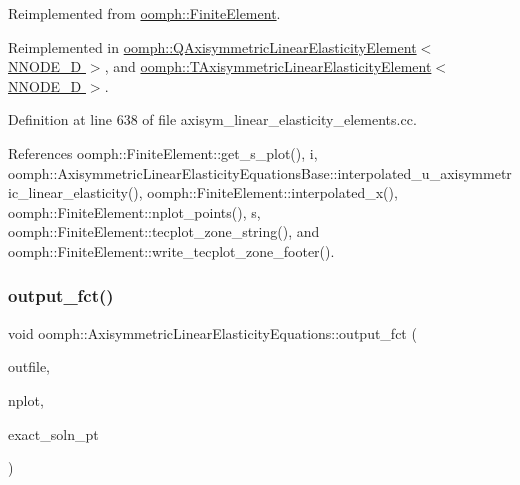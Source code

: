 Reimplemented from \hyperlink{classoomph_1_1FiniteElement_adfaee690bb0608f03320eeb9d110d48c}{oomph\+::\+Finite\+Element}.



Reimplemented in \hyperlink{classoomph_1_1QAxisymmetricLinearElasticityElement_a50c3225e93aad5867288cf55aac73195}{oomph\+::\+Q\+Axisymmetric\+Linear\+Elasticity\+Element$<$ N\+N\+O\+D\+E\+\_\+D $>$}, and \hyperlink{classoomph_1_1TAxisymmetricLinearElasticityElement_a834bb7feb673a5cf90b07ee16f6b1fa5}{oomph\+::\+T\+Axisymmetric\+Linear\+Elasticity\+Element$<$ N\+N\+O\+D\+E\+\_\+D $>$}.



Definition at line 638 of file axisym\+\_\+linear\+\_\+elasticity\+\_\+elements.\+cc.



References oomph\+::\+Finite\+Element\+::get\+\_\+s\+\_\+plot(), i, oomph\+::\+Axisymmetric\+Linear\+Elasticity\+Equations\+Base\+::interpolated\+\_\+u\+\_\+axisymmetric\+\_\+linear\+\_\+elasticity(), oomph\+::\+Finite\+Element\+::interpolated\+\_\+x(), oomph\+::\+Finite\+Element\+::nplot\+\_\+points(), s, oomph\+::\+Finite\+Element\+::tecplot\+\_\+zone\+\_\+string(), and oomph\+::\+Finite\+Element\+::write\+\_\+tecplot\+\_\+zone\+\_\+footer().

\mbox{\label{classoomph_1_1AxisymmetricLinearElasticityEquations_ae1b89f9d9c661385fe2bfcf0cbf4df20}} 
\subsubsection{\texorpdfstring{output\+\_\+fct()}{output\_fct()}\hspace{0.1cm}{\footnotesize\ttfamily [1/2]}}
{\footnotesize\ttfamily void oomph\+::\+Axisymmetric\+Linear\+Elasticity\+Equations\+::output\+\_\+fct (\begin{DoxyParamCaption}\item[{std\+::ostream \&}]{outfile,  }\item[{const unsigned \&}]{nplot,  }\item[{\hyperlink{classoomph_1_1FiniteElement_a690fd33af26cc3e84f39bba6d5a85202}{Finite\+Element\+::\+Steady\+Exact\+Solution\+Fct\+Pt}}]{exact\+\_\+soln\+\_\+pt }\end{DoxyParamCaption})\hspace{0.3cm}{\ttfamily [virtual]}}



